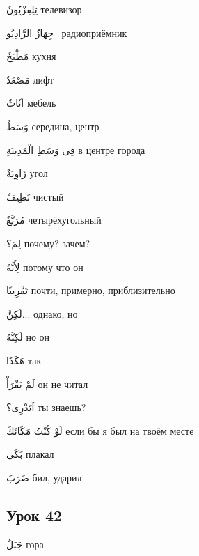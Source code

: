 \documentclass[a5paper]{article}
\newcommand\textstyleDropCaps[1]{#1}
\newcommand\textstyleCaptioncharacters[1]{#1}
\begin{document}
\textstyleCaptioncharacters{تِلِفِزْيُونٌ }\textstyleDropCaps{телевизор‎}

\textstyleCaptioncharacters{جِهَازُ الرَّادِيُو \ }\textstyleDropCaps{ра­диоприёмник‎}

\textstyleCaptioncharacters{مَطْبَخٌ }\textstyleDropCaps{кухня‎}

\textstyleCaptioncharacters{مَصْعَدٌ }\textstyleDropCaps{лифт‎}

\textstyleCaptioncharacters{اَثَاثٌ }\textstyleDropCaps{мебель‎}

\textstyleCaptioncharacters{وَسَطٌ }\textstyleDropCaps{середина, центр‎}

\textstyleCaptioncharacters{فِى وَسَطِ الْمَدِينَةِ }\textstyleDropCaps{в центре города‎}

\textstyleCaptioncharacters{زَاوِيَةٌ }\textstyleDropCaps{угол‎}

\textstyleCaptioncharacters{نَظِيفٌ }\textstyleDropCaps{чистый‎}

\textstyleCaptioncharacters{مُرَبَّعٌ }\textstyleDropCaps{четырёхугольный‎}

\textstyleCaptioncharacters{لِمَ؟ }\textstyleDropCaps{почему? зачем?‎}

\textstyleCaptioncharacters{لِأَنَّهُ }\textstyleDropCaps{потому что он‎}

\textstyleCaptioncharacters{تَقْرِيبًا }\textstyleDropCaps{почти, примерно, приблизительно‎}

\textstyleCaptioncharacters{لَكِنَّ...ِ }\textstyleDropCaps{однако, но‎}

\textstyleCaptioncharacters{لَكِنَّهُ }\textstyleDropCaps{но он‎}

\textstyleCaptioncharacters{هَكَذَا }\textstyleDropCaps{так‎}

\textstyleCaptioncharacters{لَمْ يَقْرَأْ }\textstyleDropCaps{он не читал‎}

\textstyleCaptioncharacters{اَتَدْرِى؟ }\textstyleDropCaps{ты знаешь?‎}

\textstyleCaptioncharacters{لَوْ كُنْتُ مَكَانَكَ }\textstyleDropCaps{если бы я был на твоём месте‎}

\textstyleCaptioncharacters{بَكَى }\textstyleDropCaps{плакал‎}

\textstyleCaptioncharacters{ضَرَبَ }\textstyleDropCaps{бил, ударил‎}

\subsection[Урок 42‎]{\textstyleDropCaps{Урок 42‎}}
\textstyleCaptioncharacters{جَبَلٌ }\textstyleDropCaps{гора‎}
\end{document}
